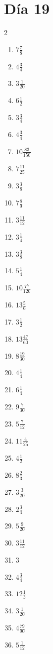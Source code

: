 \documentclass[12pt]{article}
\begin{document}
\section*{Día 19}
\begin{multicols}{2}\begin{enumerate}
\item $ 7 \frac{7}{8} $
\item $ 4 \frac{3}{4} $
\item $ 3 \frac{1}{20} $
\item $ 6 \frac{1}{2} $
\item $ 3 \frac{3}{4} $
\item $ 4 \frac{3}{4} $
\item $ 10 \frac{83}{150} $
\item $ 7 \frac{11}{25} $
\item $ 3 \frac{3}{8} $
\item $ 7 \frac{8}{9} $
\item $ 3 \frac{11}{12} $
\item $ 3 \frac{1}{4} $
\item $ 3 \frac{3}{8} $
\item $ 5 \frac{1}{4} $
\item $ 10 \frac{77}{120} $
\item $ 13 \frac{5}{6} $
\item $ 3 \frac{1}{2} $
\item $ 13 \frac{47}{60} $
\item $ 8 \frac{19}{30} $
\item $ 4 \frac{1}{4} $
\item $ 6 \frac{1}{4} $
\item $ 9 \frac{7}{30} $
\item $ 5 \frac{7}{12} $
\item $ 11 \frac{4}{25} $
\item $ 4 \frac{1}{2} $
\item $ 8 \frac{2}{3} $
\item $ 3 \frac{3}{20} $
\item $ 2 \frac{3}{4} $
\item $ 5 \frac{9}{20} $
\item $ 3 \frac{11}{12} $
\item $ 3 $
\item $ 4 \frac{3}{4} $
\item $ 12 \frac{1}{3} $
\item $ 3 \frac{1}{20} $
\item $ 4 \frac{79}{90} $
\item $ 5 \frac{1}{12} $

\end{enumerate}
\end{multicols}
\end{document}
